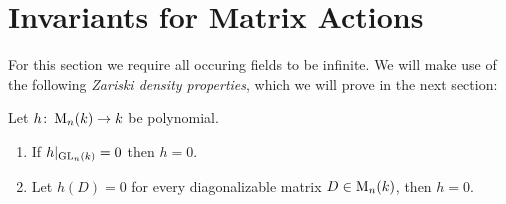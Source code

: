 \section{Invariants for Matrix Actions}


\begin{fluff}
  For this section we require all occuring fields to be infinite.
  We will make use of the following \emph{Zariski density properties}, which we will prove in the next section:
\end{fluff}


\begin{proposition}
  \label{proposition: zariski density properties}
  Let $h \colon \operatorname{M}_n(k) \to k$ be polynomial.
  \begin{enumerate}
    \item
      If $h|_{\operatorname{GL}_n(k)} = 0$ then $h = 0$.
    \item
      Let $h(D) = 0$ for every diagonalizable matrix $D \in \operatorname{M}_n(k)$, then $h = 0$.
  \end{enumerate}
\end{proposition}



